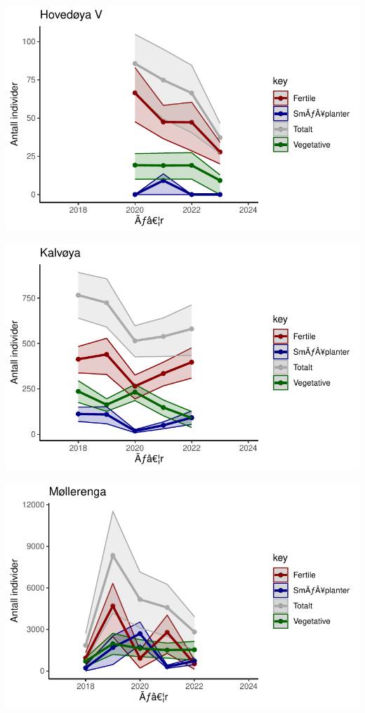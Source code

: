 \documentclass[
  letterpaper,
  DIV=11,
  numbers=noendperiod]{scrreport}
\begin{document}
\includegraphics{localEst_files/figure-pdf/unnamed-chunk-4-5.pdf}

\includegraphics{localEst_files/figure-pdf/unnamed-chunk-4-6.pdf}

\includegraphics{localEst_files/figure-pdf/unnamed-chunk-4-7.pdf}
\end{document}
